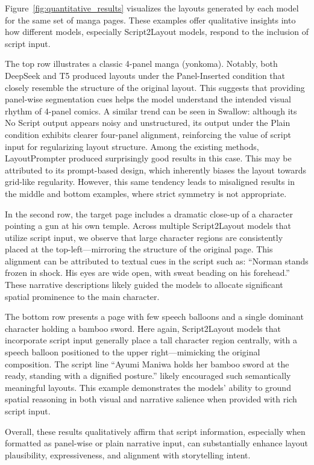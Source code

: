 \documentclass[sigconf, screen, review, anonymous]{acmart}
\begin{document}
Figure~\ref{fig:quantitative_results} visualizes the layouts generated by each model for the same set of manga pages. These examples offer qualitative insights into how different models, especially Script2Layout models, respond to the inclusion of script input.

The top row illustrates a classic 4-panel manga (yonkoma). Notably, both DeepSeek and T5 produced layouts under the Panel-Inserted condition that closely resemble the structure of the original layout. This suggests that providing panel-wise segmentation cues helps the model understand the intended visual rhythm of 4-panel comics. A similar trend can be seen in Swallow: although its No Script output appears noisy and unstructured, its output under the Plain condition exhibits clearer four-panel alignment, reinforcing the value of script input for regularizing layout structure. Among the existing methods, LayoutPrompter produced surprisingly good results in this case. This may be attributed to its prompt-based design, which inherently biases the layout towards grid-like regularity. However, this same tendency leads to misaligned results in the middle and bottom examples, where strict symmetry is not appropriate.

In the second row, the target page includes a dramatic close-up of a character pointing a gun at his own temple. Across multiple Script2Layout models that utilize script input, we observe that large character regions are consistently placed at the top-left—mirroring the structure of the original page. This alignment can be attributed to textual cues in the script such as: “Norman stands frozen in shock. His eyes are wide open, with sweat beading on his forehead.” These narrative descriptions likely guided the models to allocate significant spatial prominence to the main character.

The bottom row presents a page with few speech balloons and a single dominant character holding a bamboo sword. Here again, Script2Layout models that incorporate script input generally place a tall character region centrally, with a speech balloon positioned to the upper right—mimicking the original composition. The script line “Ayumi Maniwa holds her bamboo sword at the ready, standing with a dignified posture.” likely encouraged such semantically meaningful layouts. This example demonstrates the models’ ability to ground spatial reasoning in both visual and narrative salience when provided with rich script input.

Overall, these results qualitatively affirm that script information, especially when formatted as panel-wise or plain narrative input, can substantially enhance layout plausibility, expressiveness, and alignment with storytelling intent.
\end{document}

